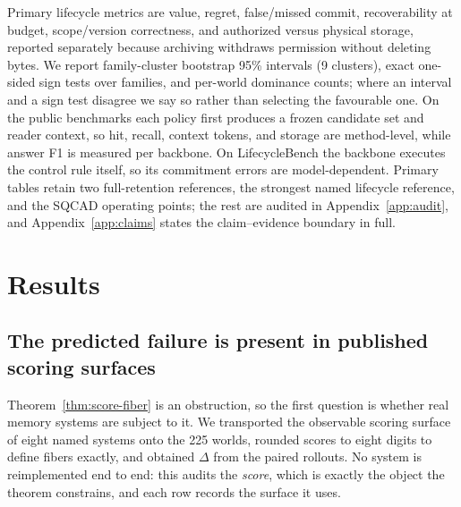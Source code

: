\documentclass{article}
\newcommand{\SQCAD}{\textsc{SQCAD}}
\begin{document}
Primary lifecycle metrics are value, regret, false/missed commit, recoverability at
budget, scope/version correctness, and authorized versus physical storage, reported
separately because archiving withdraws permission without deleting bytes. We report
family-cluster bootstrap 95\% intervals (9 clusters), exact one-sided sign tests over
families, and per-world dominance counts; where an interval and a sign test disagree
we say so rather than selecting the favourable one. On the public benchmarks each
policy first produces a frozen candidate set and reader context, so hit, recall,
context tokens, and storage are method-level, while answer F1 is measured per
backbone. On LifecycleBench the backbone executes the control rule itself, so its
commitment errors are model-dependent. Primary tables retain two full-retention
references, the strongest named lifecycle reference, and the \SQCAD{} operating
points; the rest are audited in Appendix~\ref{app:audit}, and
Appendix~\ref{app:claims} states the claim--evidence boundary in full.

\section{Results}
\label{sec:results}
\subsection{The predicted failure is present in published scoring surfaces}
\label{sec:fiber-audit}
Theorem~\ref{thm:score-fiber} is an obstruction, so the first question is whether
real memory systems are subject to it. We transported the observable scoring
surface of eight named systems onto the 225 worlds, rounded scores to eight digits
to define fibers exactly, and obtained $\Delta$ from the paired rollouts. No
system is reimplemented end to end: this audits the \emph{score}, which is exactly
the object the theorem constrains, and each row records the surface it uses.
\end{document}
